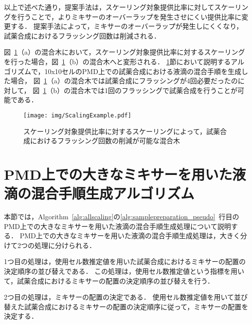 以上で述べた通り，提案手法は，スケーリング対象提供比率に対してスケーリングを行うことで，よりミキサーのオーバーラップを発生させにくい提供比率に変更する．
提案手法によって，ミキサーのオーバーラップが発生しにくくなり，試薬合成におけるフラッシング回数は削減される．

図~\ref{fig:ScalingAllTargetRatio}（a）の混合木において，スケーリング対象提供比率に対するスケーリングを行った場合，図~\ref{fig:ScalingAllTargetRatio}（b）の混合木へと変形される．
\ref{sec:GenerateProcedure}節において説明するアルゴリズムで，10x10セルのPMD上での試薬合成における液滴の混合手順を生成した場合，
図~\ref{fig:ScalingAllTargetRatio}（a）の混合木では試薬合成にフラッシングが4回必要だったのに対して，
図~\ref{fig:ScalingAllTargetRatio}（b）の混合木では1回のフラッシングで試薬合成を行うことが可能である．


\begin{figure}[tbp]
    \centering\texttt{[image: img/ScalingExample.pdf]}
 \caption{スケーリング対象提供比率に対するスケーリングによって，試薬合成におけるフラッシング回数の削減が可能な混合木}\label{fig:ScalingAllTargetRatio}
\end{figure}



\section{PMD上での大きなミキサーを用いた液滴の混合手順生成アルゴリズム}\label{sec:GenerateProcedure}

本節では，Algorithm~\ref{alg:allscaling}の\ref{alg:samplepreparation_pseudo}~行目のPMD上での大きなミキサーを用いた液滴の混合手順生成処理について説明する．
PMD上での大きなミキサーを用いた液滴の混合手順生成処理は，大きく分けて2つの処理に分けられる．

1つ目の処理は，使用セル数推定値を用いた試薬合成におけるミキサーの配置の決定順序の並び替えである．
この処理は，使用セル数推定値という指標を用いて，試薬合成におけるミキサーの配置の決定順序の並び替えを行う．

2つ目の処理は，ミキサーの配置の決定である．
使用セル数推定値を用いて並び替えた試薬合成におけるミキサーの配置の決定順序に従って，ミキサーの配置を決定する．

